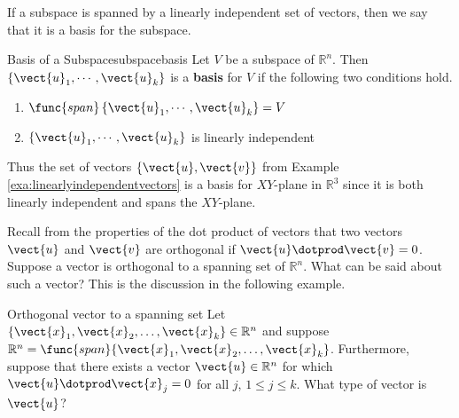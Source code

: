 If a subspace is spanned by a linearly independent set of vectors,
then we say that it is a basis for the subspace.

\begin{definition}{Basis of a Subspace}{subspacebasis}
Let $V$ be a subspace of $\mathbb{R}^{n}$. Then $\left\{
\vect{u}_{1},\cdots ,\vect{u}_{k}\right\} $ is a \textbf{basis} for
$V$ if the following two conditions
hold.

\begin{enumerate}
\item $\func{span}\left\{ \vect{u}_{1},\cdots ,\vect{u}_{k}\right\} =V$
\item $\left\{ \vect{u}_{1},\cdots ,\vect{u}_{k}\right\} $ is linearly
independent
\end{enumerate}
\end{definition}

Thus the set of vectors $\{\vect{u}, \vect{v}\}$ from Example
\ref{exa:linearlyindependentvectors} is a basis for $XY$-plane in
$\mathbb{R}^{3}$ since it is both linearly independent and spans
the $XY$-plane.

 Recall from the properties of the dot product of vectors 
that two vectors $\vect{u}$ and $\vect{v}$ are orthogonal if $\vect{u}
\dotprod \vect{v} = 0$. Suppose a vector is orthogonal to a spanning set of $\mathbb{R}^n$. What can be said about such a vector? This is the discussion in the following example.

\begin{example}{Orthogonal vector to a spanning set}{}
Let $\{\vect{x}_1, \vect{x}_2, \ldots, \vect{x}_k\}\in\mathbb{R}^n$ and
suppose $\mathbb{R}^n=\func{span}\{\vect{x}_1, \vect{x}_2, \ldots, \vect{x}_k\}$.
Furthermore, suppose that there exists a vector $\vect{u}\in\mathbb{R}^n$ for which $\vect{u}\dotprod \vect{x}_j=0$ for all $j$, $1\leq j\leq k$.
What type of vector is $\vect{u}$?
\end{example}

